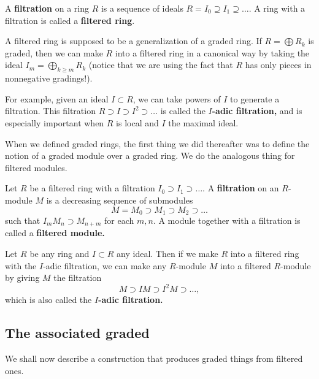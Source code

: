 \begin{definition} 
A \textbf{filtration} on a ring $R$ is a sequence of ideals $R = I_0
\supseteq I_1 \supseteq \dots$. A ring with a filtration is called a
\textbf{filtered ring}.
\end{definition} 

A filtered ring is supposed to be a generalization of a graded ring. If $R =
\bigoplus R_k$ is graded, then we can make $R$ into a filtered ring in a
canonical way by taking the ideal $I_m = \bigoplus_{k \geq m} R_k$ (notice
that we are using the fact that $R$ has only pieces in nonnegative gradings!).

\begin{example}
For example, given an ideal $I \subset R$, we
can take powers of $I$ to generate a filtration. This filtration $R \supset I
\supset I^2 \supset \dots$ is called the \textbf{$I$-adic filtration,} and is
especially important when $R$ is local and $I$ the maximal ideal.
\end{example} 




When we defined graded rings, the first thing we did thereafter was to define
the notion of a graded module over a graded ring. We do the analogous thing
for filtered modules.
\begin{definition} 
Let $R$ be a filtered ring with a filtration $I_0 \supset I_1 \supset \dots$.
A \textbf{filtration} on an $R$-module $M$ is a decreasing sequence of submodules
\[ M = M_0 \supset M_1 \supset M_2 \supset \dots  \]
such that $I_m M_n \supset M_{n+m}$ for each $m, n$. A module together with a
filtration is called a \textbf{filtered module.}
\end{definition} 


\begin{example}
Let $R$ be any ring and $I \subset R$ any ideal. Then if we make $R$ into a
filtered ring with the $I$-adic filtration, we can make any $R$-module $M$
into a filtered $R$-module by giving $M$ the filtration
\[ M \supset IM \supset I^2M \supset \dots,  \]
which is also called the \textbf{$I$-adic filtration.}
\end{example} 

\subsection{The associated graded}

We shall now describe a construction that produces graded things from filtered
ones.


